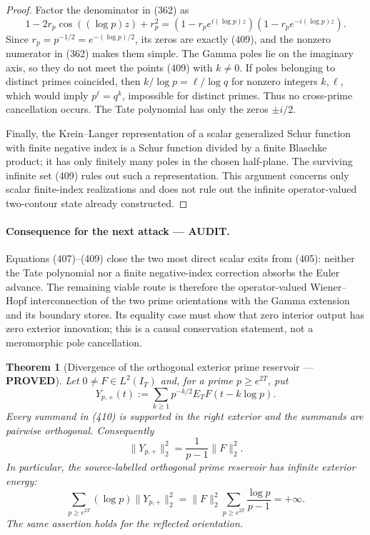 \documentclass[11pt]{article}
\newtheorem{theorem}{Theorem}
\newcommand{\PROVED}{\textcolor{green!45!black}{\textbf{PROVED}}}
\newcommand{\AUDIT}{\textcolor{orange!75!black}{\textbf{AUDIT}}}
\begin{document}
\begin{proof}
Factor the denominator in (362) as
\[
 1-2r_p\cos((\log p)z)+r_p^2
 =(1-r_pe^{i(\log p)z})(1-r_pe^{-i(\log p)z}).
\]
Since $r_p=p^{-1/2}=e^{-(\log p)/2}$, its zeros are exactly (409), and the
nonzero numerator in (362) makes them simple.  The Gamma poles lie on the
imaginary axis, so they do not meet the points (409) with $k\ne0$.
If poles belonging to distinct primes coincided, then
$k/\log p=\ell/\log q$ for nonzero integers $k,\ell$, which would imply
$p^\ell=q^k$, impossible for distinct primes.  Thus no cross-prime
cancellation occurs.  The Tate polynomial has only the zeros $\pm i/2$.

Finally, the Krein--Langer representation of a scalar generalized Schur
function with finite negative index is a Schur function divided by a finite
Blaschke product; it has only finitely many poles in the chosen half-plane.
The surviving infinite set (409) rules out such a representation.  This
argument concerns only scalar finite-index realizations and does not rule
out the infinite operator-valued two-contour state already constructed.
\end{proof}

\paragraph{Consequence for the next attack --- \AUDIT.}
Equations (407)--(409) close the two most direct scalar exits from (405):
neither the Tate polynomial nor a finite negative-index correction absorbs
the Euler advance.  The remaining viable route is therefore the
operator-valued Wiener--Hopf interconnection of the two prime orientations
with the Gamma extension and its boundary stores.  Its equality case must
show that zero interior output has zero exterior innovation; this is a
causal conservation statement, not a meromorphic pole cancellation.

\begin{theorem}[Divergence of the orthogonal exterior prime reservoir ---
\PROVED]
Let $0\ne F\in L^2(I_T)$ and, for a prime $p\ge e^{2T}$, put
\begin{equation}
 Y_{p,+}(t):=\sum_{k\ge1}p^{-k/2}E_TF(t-k\log p).
                                                               \tag{410}
\end{equation}
Every summand in (410) is supported in the right exterior and the summands
are pairwise orthogonal.  Consequently
\begin{equation}
 \|Y_{p,+}\|_2^2=\frac1{p-1}\|F\|_2^2.              \tag{411}
\end{equation}
In particular, the source-labelled orthogonal prime reservoir has infinite
exterior energy:
\begin{equation}
 \sum_{p\ge e^{2T}}(\log p)\|Y_{p,+}\|_2^2
 =\|F\|_2^2\sum_{p\ge e^{2T}}\frac{\log p}{p-1}
 =+\infty.                                           \tag{412}
\end{equation}
The same assertion holds for the reflected orientation.
\end{theorem}
\end{document}
